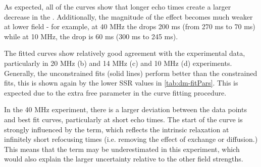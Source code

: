 \begin{table}[h]
\centering

\caption[Best fit values to the experimental data at different fields]{Best fit values to the experimental data at different fields, shaded columns indicate fixed parameters in fitting. Note that the \TtwoO values are going to be dependent on the state of the blood in the flow circuit, so are not necessarily reflective of the diffusion/exchange effects.}
\label{tab:dm-fitPars}



\vspace{1cm}


\end{table}

As expected, all of the curves show that longer echo times create a larger decrease in the \Ttwo.
Additionally, the magnitude of the effect becomes much weaker at lower field - for example, at 40 MHz the \Ttwo drops 200 ms (from 270 ms to 70 ms) while at 10 MHz, the \Ttwo drop is 60 ms (300 ms to 245 ms).

The fitted curves show relatively good agreement with the experimental data, particularly in 20 MHz (b) and 14 MHz (c) and 10 MHz (d) experiments.
Generally, the unconstrained fits (solid lines) perform better than the constrained fits, this is shown again by the lower SSR values in \autoref{tab:dm-fitPars}.
This is expected due to the extra free parameter in the curve fitting procedure.

In the 40 MHz experiment, there is a larger deviation between the data points and best fit curves, particularly at short echo times.
The start of the curve is strongly influenced by the \TtwoO term, which reflects the intrinsic relaxation at infinitely short refocusing times (i.e. removing the effect of exchange or diffusion.)
This means that the  \TtwoO term may be underestimated in this experiment, which would also explain the larger uncertainty relative to the other field strengths.

